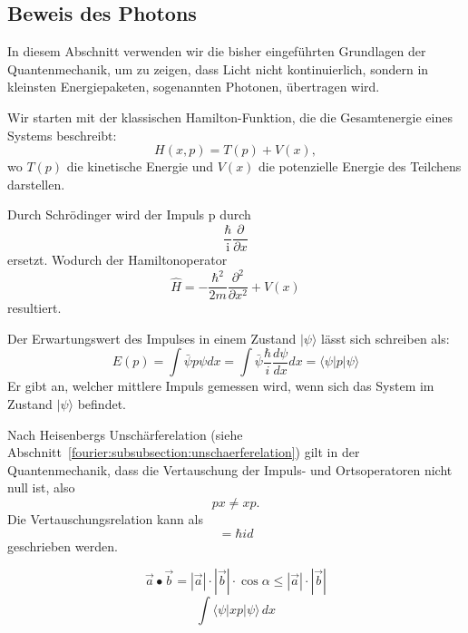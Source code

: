 \subsection{Beweis des Photons\label{fourier:subsection:beweisPhoton}}
In diesem Abschnitt verwenden wir die bisher eingeführten Grundlagen der Quantenmechanik, um zu zeigen, dass Licht nicht kontinuierlich, sondern in kleinsten Energiepaketen, sogenannten Photonen, übertragen wird.

Wir starten mit der klassischen Hamilton-Funktion, die die Gesamtenergie eines Systems beschreibt:
\begin{equation}
	H(x, p) = T(p) + V(x),
\end{equation}
wo $T(p)$ die kinetische Energie und $V(x)$ die potenzielle Energie des Teilchens darstellen.


Durch Schrödinger wird der Impuls p durch
\begin{equation}
	\frac{\hbar}{\mathrm{i}} \frac{\partial}{\partial x}
\end{equation}
ersetzt.
Wodurch der Hamiltonoperator
\begin{equation}
	\hat{H} = -\frac{\hbar^2}{2m}\frac{\partial^2}{\partial x^2} + V(x)
\end{equation}	
resultiert.

Der Erwartungswert des Impulses in einem Zustand $|\psi\rangle$ lässt sich schreiben als:
\begin{equation}
	E(p) = \int \bar{\psi}p\psi dx
	= \int \bar{\psi} \frac{\hbar}{i} \frac{d\psi}{dx} dx
	= \langle \psi | p | \psi \rangle
\end{equation}
Er gibt an, welcher mittlere Impuls gemessen wird, wenn sich das System im Zustand $|\psi\rangle$ befindet.

Nach Heisenbergs Unschärferelation (siehe Abschnitt~\ref{fourier:subsubsection:unschaerferelation}) gilt in der Quantenmechanik, dass die Vertauschung der Impuls- und Ortsoperatoren nicht null ist, also
\begin{equation}
	px \neq xp.
\end{equation}
Die Vertauschungsrelation kann als
\begin{equation}
	[x, p] = \hbar id
\end{equation}
geschrieben werden.


\begin{equation}
	\vec{a}\bullet\vec{b} = |\vec{a}| \cdot |\vec{b}| \cdot \cos{\alpha} \leq |\vec{a}| \cdot |\vec{b}|
\end{equation}
\begin{equation}
	\int \langle \psi |xp|\psi \rangle\,dx	%
\end{equation}

